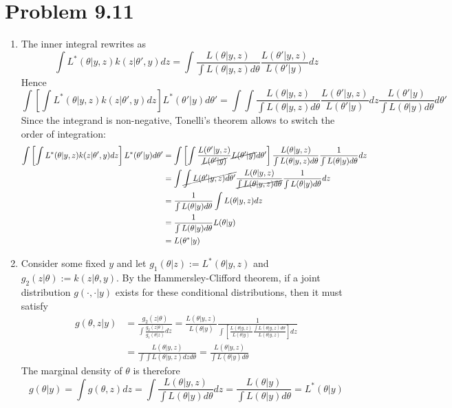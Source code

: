 \documentclass[a4paper,11pt, hidelinks]{article}
\begin{document}
\section*{Problem 9.11}
\begin{enumerate}[label=(\alph*)]
    \item The inner integral rewrites as $$\int L^*(\theta|y,z)k(z|\theta', y) dz  = \int \frac{L(\theta|y,z)}{\int L(\theta|y,z) d\theta}\frac{L(\theta'|y,z)}{ L(\theta'|y)}dz$$
    Hence $$\int \left[\int L^*(\theta|y,z)k(z|\theta', y) dz\right] L^*(\theta'|y)d\theta' = \int \int \frac{L(\theta|y,z)}{\int L(\theta|y,z) d\theta}\frac{L(\theta'|y,z)}{ L(\theta'|y)}dz \frac{L(\theta'|y)}{\int L(\theta|y)d\theta} d\theta'$$
    Since the integrand is non-negative, Tonelli's theorem allows to switch the order of integration: 
    $$\begin{aligned}
        \int \left[\int L^*(\theta|y,z)k(z|\theta', y) dz\right] L^*(\theta'|y)d\theta' &= \int \left[\int \frac{L(\theta'|y,z)}{ \cancel{L(\theta'|y)}} \cancel{L(\theta'|y)}d\theta'\right] \frac{L(\theta|y,z)}{\int L(\theta|y,z) d\theta} \frac{1}{\int L(\theta|y)d\theta}dz \\
        &= \int \cancel{\int L(\theta'|y,z) d\theta'} \frac{L(\theta|y,z)}{\cancel{\int L(\theta|y,z) d\theta}} \frac{1}{\int L(\theta|y)d\theta}dz\\
        &= \frac{1}{\int L(\theta|y)d\theta} \int L(\theta|y,z)dz \\
        &= \frac{1}{\int L(\theta|y)d\theta}  L(\theta|y)\\
        &= L(\theta^*|y)
    \end{aligned}$$
    \item Consider some fixed $y$ and let $g_1(\theta|z) := L^*(\theta| y,z)$ and  $g_2(z|\theta) := k(z|\theta, y)$. By the Hammersley-Clifford theorem, if a joint distribution $g(\cdot,\cdot|y)$ exists for these conditional distributions, then it must satisfy $$\begin{aligned}g(\theta, z|y)&=\frac{g_2(z|\theta)}{\int \frac{g_2(z|\theta)}{g_1(\theta|z)}dz} = \frac{L(\theta|y,z)}{ L(\theta|y)} \frac{1}{\int\left[ \frac{L(\theta|y,z)}{ L(\theta|y)} \frac{\int L(\theta|y,z) d\theta}{L(\theta|y,z)}\right] dz}\\
    &= \frac{ L(\theta|y,z)}{\int \int L(\theta|y,z) dz d\theta} = \frac{ L(\theta|y,z)}{\int  L(\theta|y) d\theta}
    \end{aligned}$$
    The marginal density of $\theta$ is therefore $$g(\theta|y) = \int g(\theta, z) dz = \int \frac{ L(\theta|y,z)}{\int  L(\theta|y) d\theta}dz  = \frac{ L(\theta|y)}{\int  L(\theta|y) d\theta}= L^*(\theta|y)$$

\end{enumerate}
\end{document}
